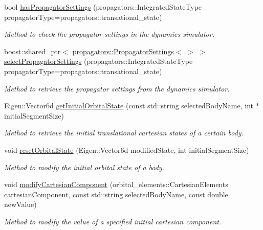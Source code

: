\begin{DoxyCompactItemize}
bool \hyperlink{structtudat_1_1optimization_1_1MissionSegmentSettings_a76e3b194435e688da751e353ebeb12f7}{has\+Propagator\+Settings} (propagators\+::\+Integrated\+State\+Type propagator\+Type=propagators\+::transational\+\_\+state)
\begin{DoxyCompactList}\small\item\em Method to check the propagator settings in the dynamics simulator. \end{DoxyCompactList}\item 
boost\+::shared\+\_\+ptr$<$ \hyperlink{classtudat_1_1propagators_1_1PropagatorSettings}{propagators\+::\+Propagator\+Settings}$<$  $>$ $>$ \hyperlink{structtudat_1_1optimization_1_1MissionSegmentSettings_ab67c2aff92faf1663f79d98438ef44ae}{select\+Propagator\+Settings} (propagators\+::\+Integrated\+State\+Type propagator\+Type=propagators\+::transational\+\_\+state)
\begin{DoxyCompactList}\small\item\em Method to retrieve the propagator settings from the dynamics simulator. \end{DoxyCompactList}\item 
Eigen\+::\+Vector6d \hyperlink{structtudat_1_1optimization_1_1MissionSegmentSettings_a880db4d100e81410e19ba8fa391265f5}{get\+Initial\+Orbital\+State} (const std\+::string selected\+Body\+Name, int $\ast$initial\+Segment\+Size)
\begin{DoxyCompactList}\small\item\em Method to retrieve the initial translational cartesian states of a certain body. \end{DoxyCompactList}\item 
void \hyperlink{structtudat_1_1optimization_1_1MissionSegmentSettings_a97ec854c48f8eac4e472f1bdffe09655}{reset\+Orbital\+State} (Eigen\+::\+Vector6d modified\+State, int initial\+Segment\+Size)
\begin{DoxyCompactList}\small\item\em Method to modify the initial orbital state of a body. \end{DoxyCompactList}\item 
void \hyperlink{structtudat_1_1optimization_1_1MissionSegmentSettings_a476445910c06b0f86a636f0f18a3009a}{modify\+Cartesian\+Component} (orbital\+\_\+elements\+::\+Cartesian\+Elements cartesian\+Component, const std\+::string selected\+Body\+Name, const double new\+Value)
\begin{DoxyCompactList}\small\item\em Method to modify the value of a specified initial cartesian component. \end{DoxyCompactList}\item 

\end{DoxyCompactItemize}
